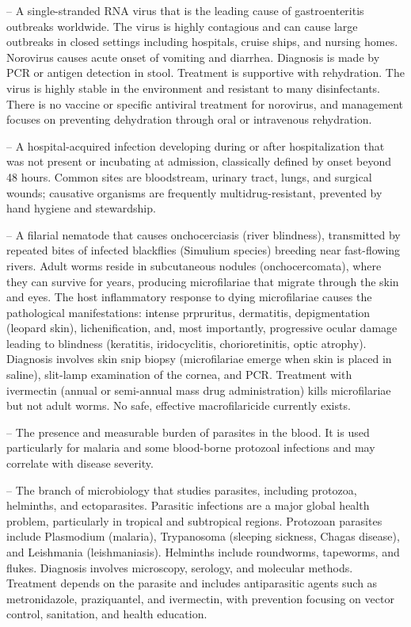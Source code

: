 -- A single-stranded RNA virus that is the leading cause of gastroenteritis outbreaks worldwide. The virus is highly contagious and can cause large outbreaks in closed settings including hospitals, cruise ships, and nursing homes. Norovirus causes acute onset of vomiting and diarrhea. Diagnosis is made by PCR or antigen detection in stool. Treatment is supportive with rehydration. The virus is highly stable in the environment and resistant to many disinfectants. There is no vaccine or specific antiviral treatment for norovirus, and management focuses on preventing dehydration through oral or intravenous rehydration.

-- A hospital-acquired infection developing during or after hospitalization that was not present or incubating at admission, classically defined by onset beyond 48 hours. Common sites are bloodstream, urinary tract, lungs, and surgical wounds; causative organisms are frequently multidrug-resistant, prevented by hand hygiene and stewardship.

-- A filarial nematode that causes onchocerciasis (river blindness), transmitted by repeated bites of infected blackflies (Simulium species) breeding near fast-flowing rivers. Adult worms reside in subcutaneous nodules (onchocercomata), where they can survive for years, producing microfilariae that migrate through the skin and eyes. The host inflammatory response to dying microfilariae causes the pathological manifestations: intense prpruritus, dermatitis, depigmentation (leopard skin), lichenification, and, most importantly, progressive ocular damage leading to blindness (keratitis, iridocyclitis, chorioretinitis, optic atrophy). Diagnosis involves skin snip biopsy (microfilariae emerge when skin is placed in saline), slit-lamp examination of the cornea, and PCR. Treatment with ivermectin (annual or semi-annual mass drug administration) kills microfilariae but not adult worms. No safe, effective macrofilaricide currently exists.

-- The presence and measurable burden of parasites in the blood. It is used particularly for malaria and some blood-borne protozoal infections and may correlate with disease severity.

-- The branch of microbiology that studies parasites, including protozoa, helminths, and ectoparasites. Parasitic infections are a major global health problem, particularly in tropical and subtropical regions. Protozoan parasites include Plasmodium (malaria), Trypanosoma (sleeping sickness, Chagas disease), and Leishmania (leishmaniasis). Helminths include roundworms, tapeworms, and flukes. Diagnosis involves microscopy, serology, and molecular methods. Treatment depends on the parasite and includes antiparasitic agents such as metronidazole, praziquantel, and ivermectin, with prevention focusing on vector control, sanitation, and health education.

